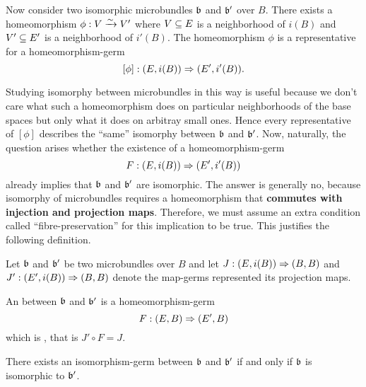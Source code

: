 \begin{myparagraph}
    Now consider two isomorphic microbundles $\mathfrak{b}$ and $\mathfrak{b}'$ over $B$.
    There exists a homeomorphism $\phi: V \xrightarrow{\sim} V'$ where $V \subseteq{} E$ is a neighborhood of $i(B)$ and $V' \subseteq{} E'$ is a neighborhood of $i'(B)$.
    The homeomorphism $\phi$ is a representative for a homeomorphism-germ
    \[ [\phi]: (E, i(B)) \Rightarrow (E', i'(B)). \]

    Studying isomorphy between microbundles in this way is useful because we don't care what such a
    homeomorphism does on particular neighborhoods of the base spaces but only what it does on arbitray small ones.
    Hence every representative of $[\phi]$ describes the ``same'' isomorphy between $\mathfrak{b}$ and $\mathfrak{b}'$.
    Now, naturally, the question arises whether the existence of a homeomorphism-germ
    \[ F: (E, i(B)) \Rightarrow (E', i'(B)) \]
    already implies that $\mathfrak{b}$ and $\mathfrak{b}'$ are isomorphic.
    The answer is generally no, because isomorphy of microbundles requires 
    a homeomorphism that \textbf{commutes with injection and projection maps}.
    Therefore, we must assume an extra condition called ``fibre-preservation'' for this implication to be true.
    This justifies the following definition.
    
    Let $\mathfrak{b}$ and $\mathfrak{b}'$ be two microbundles over $B$ and
    let $J: (E, i(B)) \Rightarrow (B, B)$ and $J': (E', i(B)) \Rightarrow (B, B)$ denote the map-germs represented its projection maps.
\end{myparagraph}

\begin{mydefinition}
    An  between $\mathfrak{b}$ and $\mathfrak{b}'$ is a homeomorphism-germ 
    \[ F: (E, B) \Rightarrow (E', B) \]
    which is , that is $J' \circ F = J$.
\end{mydefinition}

\begin{myremark}
    There exists an isomorphism-germ between $\mathfrak{b}$ and $\mathfrak{b}'$ if and only if $\mathfrak{b}$ is isomorphic to $\mathfrak{b}'$.
\end{myremark}